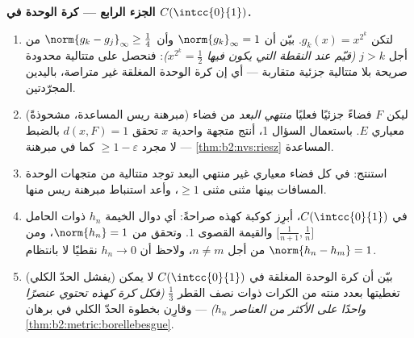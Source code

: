 \begin{problem}
\medskip
\noindent\textbf{الجزء الرابع --- كرة الوحدة في
$C(\intcc{0}{1})$.}
\begin{enumerate}[resume]
  \item لتكن $g_k(x) = x^{2^k}$. بيّن أن $\norm{g_k}_\infty = 1$ وأن
        $\norm{g_k - g_j}_\infty \geq \frac14$ من أجل $j > k$
        \emph{(قيّم عند النقطة التي يكون فيها $x^{2^k} =
        \frac12$)}: فنحصل على متتالية محدودة صريحة بلا
        متتالية جزئية متقاربة --- أي إن كرة الوحدة المغلقة غير
        متراصة، باليدين المجرّدتين.
  \item (مبرهنة ريس المساعدة، مشحوذةً) ليكن $F$ فضاءً جزئيًا فعليًا
        \emph{منتهي البعد} من فضاء معياري
        $E$. باستعمال السؤال 1، أنتج متجهة واحدية $x$
        تحقق $d(x, F) = 1$ بالضبط --- لا مجرد $\geq 1 -
        \varepsilon$ كما في مبرهنة \cref{thm:b2:nvs:riesz} المساعدة.
  \item استنتج: في كل فضاء معياري غير منتهي البعد توجد
        متتالية من متجهات الوحدة المسافات بينها مثنى مثنى
        $\geq 1$، وأعد استنباط مبرهنة ريس منها.
  \item في $C(\intcc{0}{1})$، أبرِز كوكبة كهذه
        صراحةً: أي دوال الخيمة $h_n$ ذوات الحامل
        $\bigl[\frac1{n+1}, \frac1n\bigr]$ والقيمة القصوى $1$.
        وتحقق من $\norm{h_n} = 1$، ومن $\norm{h_n - h_m} = 1$ من أجل $n
        \neq m$، ولاحظ أن $h_n \to 0$ نقطيًا لا
        بانتظام.
  \item (يفشل الحدّ الكلي) بيّن أن كرة الوحدة المغلقة
        في $C(\intcc{0}{1})$ لا يمكن تغطيتها بعدد منته من
        الكرات ذوات نصف القطر $\frac13$ \emph{(فكل كرة كهذه تحتوي
        عنصرًا واحدًا على الأكثر من العناصر $h_n$)} --- وقارِن بخطوة
        الحدّ الكلي في برهان
        \cref{thm:b2:metric:borellebesgue}.
\end{enumerate}


\end{problem}
